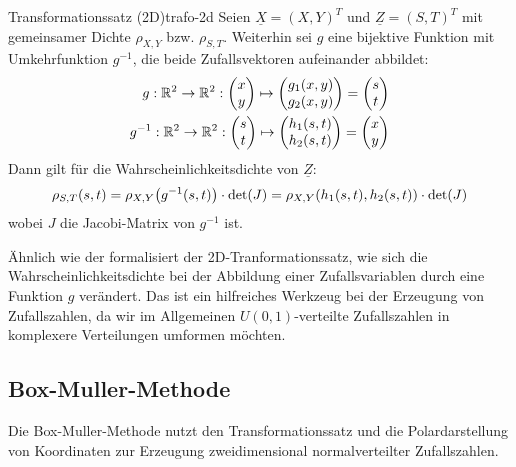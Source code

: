\begin{theorem}{Transformationssatz (2D)}{trafo-2d}
Seien $\underline{X} = (X, Y)^T$ und $\underline{Z} = (S,T)^T$
 mit gemeinsamer Dichte
$\rho_{X,Y}$ bzw. $\rho_{S,T}$. Weiterhin sei $g$ eine bijektive Funktion mit
Umkehrfunktion $g^{-1}$, die beide Zufallsvektoren aufeinander
abbildet:
\begin{align*}
g: \mathbb{R}^2\to\mathbb{R}^2: \begin{pmatrix}x\\y\end{pmatrix}\mapsto
  \begin{pmatrix}g_1(x,y)\\g_2(x,y)\end{pmatrix} =
  \begin{pmatrix}s\\t\end{pmatrix} \\
g^{-1}: \mathbb{R}^2\to\mathbb{R}^2: \begin{pmatrix}s\\t\end{pmatrix}\mapsto
  \begin{pmatrix}h_1(s,t)\\h_2(s, t)\end{pmatrix} =
  \begin{pmatrix}x\\y\end{pmatrix}
\end{align*}
Dann gilt für die Wahrscheinlichkeitsdichte von $\underline{Z}$:
\[
\rho_{S,T}(s,t) = \rho_{X,Y}\big(g^{-1}(s,t)\big)\cdot\operatorname{det}(J) =
  \rho_{X,Y}(h_1(s,t), h_2(s,t)) \cdot \operatorname{det}(J)
\]
wobei $J$ die Jacobi-Matrix von $g^{-1}$ ist.
\end{theorem}

Ähnlich wie der  formalisiert der
2D-Tranformationssatz, wie sich die Wahrscheinlichkeitsdichte bei der Abbildung
einer Zufallsvariablen durch eine Funktion $g$ verändert. Das ist ein hilfreiches
Werkzeug bei der Erzeugung von Zufallszahlen, da wir im Allgemeinen
$U(0,1)$-verteilte Zufallszahlen in komplexere Verteilungen umformen möchten.

\subsection{Box-Muller-Methode}

Die Box-Muller-Methode nutzt den Transformationssatz und die Polardarstellung
von Koordinaten zur Erzeugung zweidimensional normalverteilter Zufallszahlen.

